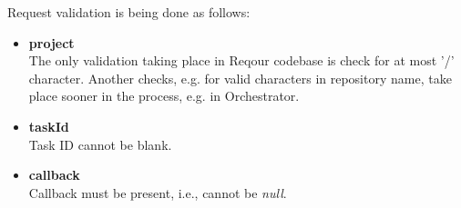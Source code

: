\documentclass[../main.text]{subfiles}
\begin{document}
Request validation is being done as follows:

\begin{itemize}
    \item \textbf{project}\\
    The only validation taking place in Reqour codebase is check for at most '/' character. Another checks, e.g. for valid characters in repository name, take place sooner in the process, e.g. in Orchestrator.

    \item \textbf{taskId}\\
    Task ID cannot be blank.

    \item \textbf{callback}\\
    Callback must be present, i.e., cannot be \textit{null}.
\end{itemize}
\end{document}
